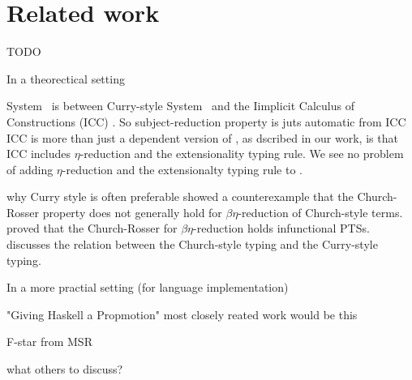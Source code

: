 \section{Related work}
\label{sec:relwork}
TODO

In a theorectical setting

System \Fi\ is between Curry-style System \Fw\ and
the Iimplicit Calculus of Constructions (ICC) \cite{Miquel01}.
So subject-reduction property is juts automatic from ICC
ICC is more than just a dependent version of \Fi, as dscribed in our
work, is that ICC includes $\eta$-reduction and the extensionality typing rule.
We see no problem of adding $\eta$-reduction and the extensionalty typing rule
to \Fi.

why Curry style is often preferable
\citet{Nederpelt73} showed a counterexample that the Church-Rosser property
does not generally hold for $\beta\eta$-reduction of Church-style terms.
\citet{Geuvers92} proved that the Church-Rosser for $\beta\eta$-reduction
holds infunctional PTSs. \citet{Seldin08} discusses the relation between
the Church-style typing and the Curry-style typing. 


In a more practial setting (for language implementation)

"Giving Haskell a Propmotion" \cite{YorgeyWCJVM12}
most closely reated work would be this

F-star from MSR
\cite{Swamy11}

what others to discuss?

